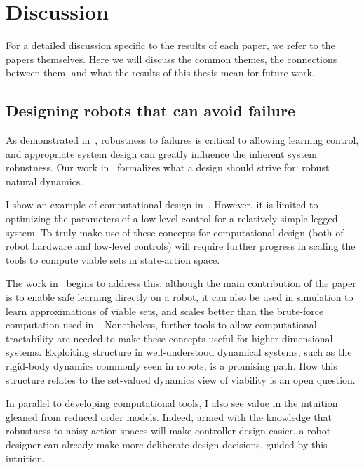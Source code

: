 
\chapter{Discussion}

For a detailed discussion specific to the results of each paper, we refer to the papers themselves. Here we will discuss the common themes, the connections between them, and what the results of this thesis mean for future work.

\section{Designing robots that can avoid failure}

As demonstrated in~\cite{heim2018shaping}, robustness to failures is critical to allowing learning control, and appropriate system design can greatly influence the inherent system robustness. Our work in~\cite{heim2019beyond} formalizes what a design should strive for: robust natural dynamics. \par
I show an example of computational design in~\cite{heim2019beyond}. However, it is limited to optimizing the parameters of a low-level control for a relatively simple legged system. To truly make use of these concepts for computational design (both of robot hardware and low-level controls) will require further progress in scaling the tools to compute viable sets in state-action space. \par
The work in~\cite{heim2019learnable} begins to address this: although the main contribution of the paper is to enable safe learning directly on a robot, it can also be used in simulation to learn approximations of viable sets, and scales better than the brute-force computation used in~\cite{heim2019beyond}.
Nonetheless, further tools to allow computational tractability are needed to make these concepts useful for higher-dimensional systems. Exploiting structure in well-understood dynamical systems, such as the rigid-body dynamics commonly seen in robots, is a promising path. How this structure relates to the set-valued dynamics view of viability is an open question. \par
In parallel to developing computational tools, I also see value in the intuition gleaned from reduced order models. Indeed, armed with the knowledge that robustness to noisy action spaces will make controller design easier, a robot designer can already make more deliberate design decisions, guided by this intuition.

